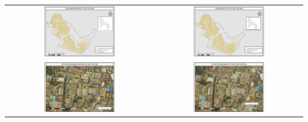 \documentclass[a4paper,12pt,twoside]{article}
\begin{document}
\begin{tabular}{|c@{}c|}
  \hline
 
 \includegraphics[width=0.5\textwidth]{images/Magomeni_Before_Redigitization.png}&%
    \includegraphics[width=0.5\textwidth]{images/Magomeni_After_Redigitization.png}\\
 \includegraphics[width=0.5\textwidth]{images/Detailed_Magomeni_Before_Redigitization.png}&%
    \includegraphics[width=0.5\textwidth]{images/Detailed_Magomeni_After_Redigitization.png}\\
  \hline
\end{tabular}
\end{document}
